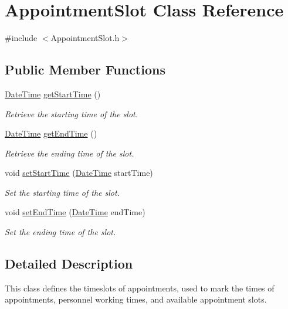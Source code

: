 \hypertarget{classAppointmentSlot}{\section{Appointment\-Slot Class Reference}
\label{classAppointmentSlot}
}


{\ttfamily \#include $<$Appointment\-Slot.\-h$>$}

\subsection*{Public Member Functions}
\begin{DoxyCompactItemize}
\item 
\hyperlink{structDateTime}{Date\-Time} \hyperlink{classAppointmentSlot_ae1bc0c4c7cdfd6ff0e19dac860ac1795}{get\-Start\-Time} ()
\begin{DoxyCompactList}\small\item\em Retrieve the starting time of the slot. \end{DoxyCompactList}\item 
\hyperlink{structDateTime}{Date\-Time} \hyperlink{classAppointmentSlot_aaabb9dee474cf30db424e4ab84c0f7a8}{get\-End\-Time} ()
\begin{DoxyCompactList}\small\item\em Retrieve the ending time of the slot. \end{DoxyCompactList}\item 
void \hyperlink{classAppointmentSlot_a4e4bad089724bdecf9c71332b34ae50f}{set\-Start\-Time} (\hyperlink{structDateTime}{Date\-Time} start\-Time)
\begin{DoxyCompactList}\small\item\em Set the starting time of the slot. \end{DoxyCompactList}\item 
void \hyperlink{classAppointmentSlot_a2ca48b95d7b9f578f2f23f6d86a7f069}{set\-End\-Time} (\hyperlink{structDateTime}{Date\-Time} end\-Time)
\begin{DoxyCompactList}\small\item\em Set the ending time of the slot. \end{DoxyCompactList}\end{DoxyCompactItemize}


\subsection{Detailed Description}
This class defines the timeslots of appointments, used to mark the times of appointments, personnel working times, and available appointment slots.

